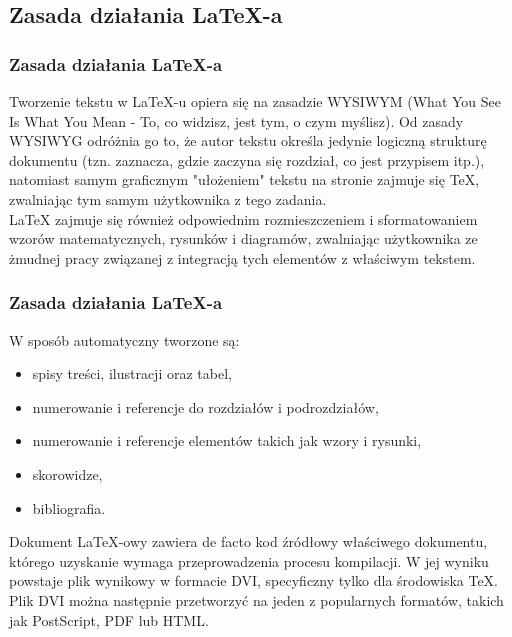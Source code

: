 \documentclass[serif]{beamer}
\begin{document}
\begin{frame} \section{Zasada działania LaTeX-a}
\frametitle{Zasada działania LaTeX-a}

Tworzenie tekstu w LaTeX-u opiera się na zasadzie WYSIWYM (What You See Is What You Mean - To, co widzisz, jest tym, o czym myślisz). Od zasady WYSIWYG odróżnia go to, że autor tekstu określa jedynie logiczną strukturę dokumentu (tzn. zaznacza, gdzie zaczyna się rozdział, co jest przypisem itp.), natomiast samym graficznym "ułożeniem" tekstu na stronie zajmuje się TeX, zwalniając tym samym użytkownika z tego zadania. \\

LaTeX zajmuje się również odpowiednim rozmieszczeniem i sformatowaniem wzorów matematycznych, rysunków i diagramów, zwalniając użytkownika ze żmudnej pracy związanej z integracją tych elementów z właściwym tekstem.\\




\end{frame} 

\begin{frame} \frametitle{Zasada działania LaTeX-a}
\small
W sposób automatyczny tworzone są:

\begin{itemize}
	\item spisy treści, ilustracji oraz tabel,
\item numerowanie i referencje do rozdziałów i podrozdziałów,
\item numerowanie i referencje elementów takich jak wzory i rysunki,
\item skorowidze,
\item bibliografia.
\end{itemize}
\footnotesize
Dokument LaTeX-owy zawiera de facto kod źródłowy właściwego dokumentu, którego uzyskanie wymaga przeprowadzenia procesu kompilacji. W jej wyniku powstaje plik wynikowy w formacie DVI, specyficzny tylko dla środowiska TeX. Plik DVI można następnie przetworzyć na jeden z popularnych formatów, takich jak PostScript, PDF lub HTML.

\end{frame}
\end{document}
